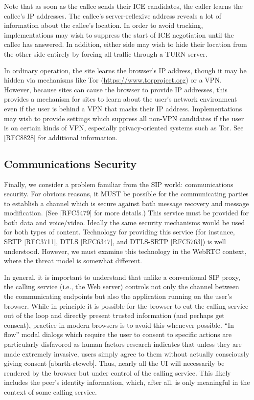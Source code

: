 \documentclass{article}
\begin{document}
Note that as soon as the callee sends their ICE candidates, the
caller learns the callee's IP addresses.  The callee's server-reflexive
address reveals a lot of information about the callee's
location.  In order to avoid tracking, implementations may wish to
suppress the start of ICE negotiation until the callee has answered.
In addition, either side may wish to hide their location from the
other side entirely by forcing all traffic through a TURN server.

In ordinary operation, the site learns the browser's IP address,
though it may be hidden via mechanisms like Tor
(\url{https://www.torproject.org}) or a VPN.  However, because sites can
cause the browser to provide IP addresses, this provides a mechanism
for sites to learn about the user's network environment even if the
user is behind a VPN that masks their IP address.  Implementations
may wish to provide settings which suppress all non-VPN candidates if
the user is on certain kinds of VPN, especially privacy-oriented
systems such as Tor.  See [RFC8828] for additional information.

\subsection{Communications Security}

Finally, we consider a problem familiar from the SIP world:
communications security.  For obvious reasons, it MUST be possible
for the communicating parties to establish a channel which is secure
against both message recovery and message modification.  (See
[RFC5479] for more details.)  This service must be provided for both
data and voice/video.  Ideally the same security mechanisms would be
used for both types of content.  Technology for providing this
service (for instance, SRTP [RFC3711], DTLS [RFC6347], and DTLS-SRTP
[RFC5763]) is well understood.  However, we must examine this
technology in the WebRTC context, where the threat model is somewhat
different.

In general, it is important to understand that unlike a conventional
SIP proxy, the calling service (i.e., the Web server) controls not
only the channel between the communicating endpoints but also the
application running on the user's browser.  While in principle it is
possible for the browser to cut the calling service out of the loop
and directly present trusted information (and perhaps get consent),
practice in modern browsers is to avoid this whenever possible.
``In-flow'' modal dialogs which require the user to consent to specific
actions are particularly disfavored as human factors research
indicates that unless they are made extremely invasive, users simply
agree to them without actually consciously giving consent
[abarth-rtcweb].  Thus, nearly all the UI will necessarily be
rendered by the browser but under control of the calling service.
This likely includes the peer's identity information, which, after
all, is only meaningful in the context of some calling service.
\end{document}
